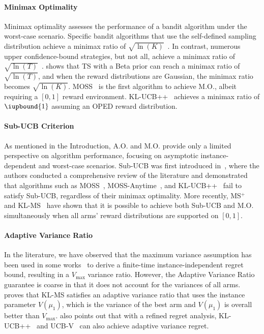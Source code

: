 \paragraph{Minimax Optimality} Minimax optimality assesses the performance of a bandit algorithm under the worst-case scenario. Specific bandit algorithms that use the self-defined sampling distribution achieve a minimax ratio of $\sqrt{\ln(K)}$~\citep{jin2023thompson, jin2022finite}. In contrast, numerous upper confidence-bound strategies, but not all, achieve a minimax ratio of $\sqrt{\ln(T)}$~\citep{cappe2013kullback, auer2002finite}. 
\citet{agrawal2017near} shows that TS with a Beta prior can reach a minimax ratio of $\sqrt{\ln(T)}$, and when the reward distributions are Gaussian, the minimax ratio becomes $\sqrt{\ln(K)}$. MOSS~\citep{audibert2009minimax} is the first algorithm to achieve M.O., albeit requiring a $[0, 1]$ reward environment. KL-UCB++~\citep{menard2017minimax} achieves a minimax ratio of $\iupbound{1}$ assuming an OPED reward distribution. 


\paragraph{Sub-UCB Criterion}
As mentioned in the Introduction, A.O. and M.O. provide only a limited perspective on algorithm performance, focusing on asymptotic instance-dependent and worst-case scenarios. Sub-UCB was first introduced in~\citet{lattimore18refining}, where the authors conducted a comprehensive review of the literature and demonstrated that algorithms such as MOSS~\citep{audibert2009minimax}, MOSS-Anytime~\citep{degenne2016anytime}, and KL-UCB++~\citep{menard2017minimax} fail to satisfy Sub-UCB, regardless of their minimax optimality.
More recently, MS$^+$~\citep{bian2022maillard} and KL-MS~\citep{qin2023kullback} have shown that it is possible to achieve both Sub-UCB and M.O. simultaneously when all arms' reward distributions are supported on $[0,1]$.

\paragraph{Adaptive Variance Ratio}
In the literature, we have observed that the maximum variance assumption has been used in some works~\citep{jin2022finite, jin2023thompson, menard2017minimax} to derive a finite-time instance-independent regret bound, resulting in a $V_{\max}$ variance ratio.
However, the Adaptive Variance Ratio guarantee is coarse in that it does not account for the variances of all arms. \citet{qin2023kullback} proves that KL-MS satisfies an adaptive variance ratio that uses the instance parameter $V(\mu_1)$, which is the variance of the best arm and $V(\mu_1)$ is overall better than $V_{\max}$.
\citet{qin2023kullback} also points out that with a refined regret analysis, KL-UCB++~\citep{menard17minimax} and UCB-V~\citep{audibert09exploration} can also achieve adaptive variance regret.